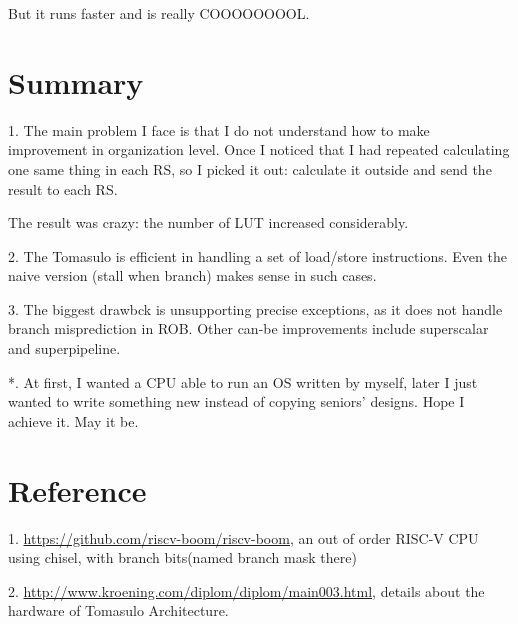 \documentclass[12pt,letterpaper]{article}
\begin{document}
    But it runs faster and is really COOOOOOOOL. 
\section{Summary}
    1. The main problem I face is that I do not understand how to make improvement in organization level. Once I noticed that I had repeated 
    calculating one same thing in each RS, so I picked it out: calculate it outside and send the result to each RS. 

    The result was crazy: the number of LUT increased considerably. 

    2. The Tomasulo is efficient in handling a set of load/store instructions. Even the naive version (stall when branch) makes sense in such cases. 

    3. The biggest drawbck is unsupporting precise exceptions, as it does not handle branch misprediction in ROB. 
    Other can-be improvements include superscalar and superpipeline. 

    *. At first, I wanted a CPU able to run an OS written by myself, later I just wanted to write something new instead of copying 
    seniors' designs. Hope I achieve it. May it be. 
\section{Reference}

1. \url{https://github.com/riscv-boom/riscv-boom}, an out of order RISC-V CPU using chisel, with branch bits(named branch mask there)

2. \url{http://www.kroening.com/diplom/diplom/main003.html}, details about the hardware of Tomasulo Architecture.
\end{document}
